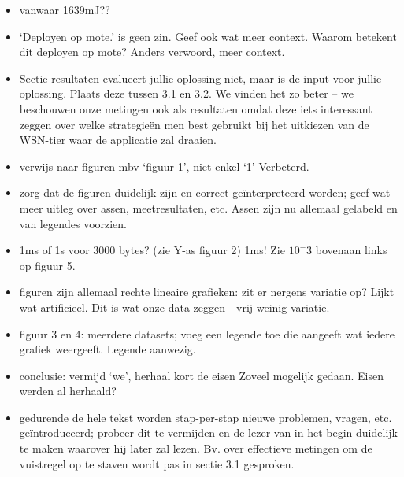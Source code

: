 \documentclass[11pt]{article}
\begin{document}
\begin{itemize}
\item vanwaar 1639mJ?? 
\item ‘Deployen op mote.’ is geen zin. Geef ook wat meer context. Waarom betekent dit deployen op mote? {\color{red} Anders verwoord, meer context.}
\item Sectie resultaten evalueert jullie oplossing niet, maar is de input voor jullie oplossing. Plaats deze tussen 3.1 en 3.2. {\color{red} We vinden het zo beter -- we beschouwen onze metingen ook als resultaten omdat deze iets interessant zeggen over welke strategie\"en men best gebruikt bij het uitkiezen van de WSN-tier waar de applicatie zal draaien.}
\item verwijs naar figuren mbv ‘figuur 1’, niet enkel ‘1’ {\color{red} Verbeterd.}
\item zorg dat de figuren duidelijk zijn en correct geïnterpreteerd worden; geef wat meer uitleg over assen, meetresultaten, etc. {\color{red} Assen zijn nu allemaal gelabeld en van legendes voorzien.}
\item 1ms of 1s voor 3000 bytes? (zie Y-as figuur 2) {\color{red} 1ms! Zie $10^-3$ bovenaan links op figuur 5.}
\item figuren zijn allemaal rechte lineaire grafieken: zit er nergens variatie op? Lijkt wat artificieel. {\color{red} Dit is wat onze data zeggen - vrij weinig variatie.}
\item figuur 3 en 4: meerdere datasets; voeg een legende toe die aangeeft wat iedere grafiek weergeeft. {\color{red} Legende aanwezig.}
\item conclusie: vermijd ‘we’, herhaal kort de eisen {\color{red} Zoveel mogelijk gedaan. Eisen werden al herhaald?}

\item gedurende de hele tekst worden stap-per-stap nieuwe problemen, vragen, etc. geïntroduceerd; probeer dit te vermijden en de lezer van in het begin duidelijk te maken waarover hij later zal lezen. Bv. over effectieve metingen om de vuistregel op te staven wordt pas in sectie 3.1 gesproken.
\end{itemize}
\end{document}
